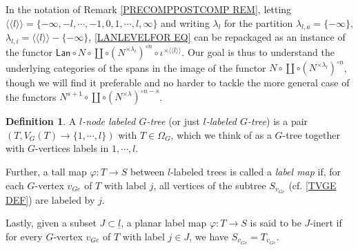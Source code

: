 \documentclass[a4paper,10pt
,draft
]{article}%
\numberwithin{equation}{section}
\numberwithin{figure}{section}
\theoremstyle{definition} %
\newtheorem{definition}[equation]{Definition}%
\newcommand{\1}{\ensuremath{\mathbbm 1}}%
\begin{document}
In the notation 
of Remark \ref{PRECOMPPOSTCOMP REM},
letting 
$\langle \langle l 
\rangle \rangle = 
\{-\infty,-l,\cdots, -1, 0, 1, \cdots, l, \infty\}$ and writing
$\lambda_{l}$ for the partition
$\lambda_{l,a} = \{-\infty\}$,
$\lambda_{l,i} = 
\langle \langle l \rangle \rangle - \{-\infty\}$,
\eqref{LANLEVELFOR EQ}
can be repackaged as an instance of the functor
$\mathsf{Lan} \circ N \circ \coprod \circ (N^{\times \lambda_l})^{\circ n}\circ \iota^{\times \langle \langle l \rangle \rangle}$.
Our goal is thus to understand 
the underlying categories of the spans in the image of the functor
$N \circ \coprod \circ (N^{\times \lambda_l})^{\circ n}$,
though we will find it preferable and no harder to tackle the more general case of the functors 
$N^{s+1} \circ \coprod \circ (N^{\times \lambda})^{\circ n-s}$.

\begin{definition}\label{LABMAP DEF}
A \textit{$l$-node labeled $G$-tree} (or just \textit{$l$-labeled $G$-tree}) is a pair $(T,V_G(T) \to \{1,\cdots,l\})$ with $T \in \Omega_G$, which we think of as a $G$-tree together with $G$-vertices labels in $1,\cdots,l$.

Further, a tall map $\varphi \colon T \to S$ between $l$-labeled trees is called a \textit{label map} if, for each $G$-vertex $v_{G e}$ of $T$ with label $j$, all vertices of the subtree $S_{v_{G e}}$ (cf. \eqref{TVGE DEF}) are labeled by $j$.

Lastly, given a subset $J\subset \underline{l}$, a planar label map $\varphi \colon T \to S$ is said to be $J$-inert if for every $G$-vertex $v_{G e}$ of $T$ with label $j \in J$, we have $S_{v_{Ge}} = T_{v_{Ge}}$.
\end{definition}
\end{document}
